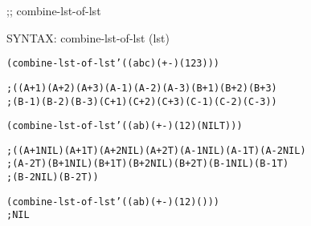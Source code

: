 \begin{aibox}{\function}
;; combine-lst-of-lst

SYNTAX: combine-lst-of-lst (lst)
\end{aibox}

\begin{aibox}{\examples}
\begin{alltt}
 (combine-lst-of-lst '((a b c) (+ -) (1 2 3)))

;((A + 1) (A + 2) (A + 3) (A - 1) (A - 2) (A - 3) (B + 1) (B + 2) (B + 3)
; (B - 1) (B - 2) (B - 3) (C + 1) (C + 2) (C + 3) (C - 1) (C - 2) (C - 3))

(combine-lst-of-lst '((a b) (+ -) (1 2) (NIL T)))

; ((A + 1 NIL) (A + 1 T) (A + 2 NIL) (A + 2 T) (A - 1 NIL) (A - 1 T) (A - 2 NIL)
; (A - 2 T) (B + 1 NIL) (B + 1 T) (B + 2 NIL) (B + 2 T) (B - 1 NIL) (B - 1 T)
; (B - 2 NIL) (B - 2 T))

(combine-lst-of-lst '((a b) (+ -) (1 2) ()))
; NIL
\end{alltt}

\end{aibox}

